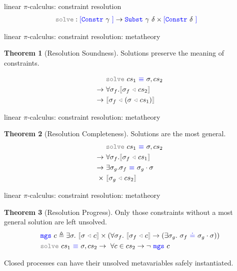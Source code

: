 \documentclass[dvipsnames]{beamer}
\theoremstyle{definition}\newtheorem{mytheorem}{Theorem}[section]
\newcommand{\picalc}{$\pi$-calculus}
\newcommand{\func}[1]{\textcolor{gray}{\mathtt{#1}}}
\newcommand{\type}[1]{\textcolor{blue}{\mathtt{#1}}}
\newcommand{\tEq}[2]{#1~\type{\equiv}~#2}
\newcommand{\tConstrs}[1]{\type{[Constr} ~ #1 ~ \type{]}}
\newcommand{\subst}[2]{#1 ~ \func{\triangleleft} ~ #2}
\newcommand{\tSubst}[2]{\type{Subst}~#1~#2}
\newcommand{\interpr}[1]{\func{[\![} #1 \func{]\!]}}
\begin{document}
\begin{frame}{linear \picalc{}: constraint resolution}
\[
\begin{aligned}[c]
\func{solve} &: \tConstrs{\gamma} \to \tSubst{\gamma}{\delta} \times \tConstrs{\delta}
\end{aligned}
\]
\end{frame}

\begin{frame}{linear \picalc{}: constraint resolution: metatheory}
\begin{mytheorem}[Resolution Soundness]\label{resolution-soundness}
Solutions preserve the meaning of constraints.
\end{mytheorem}
\[
\begin{aligned}[c]
& \func{solve}~cs_1 \tEq{} \sigma , cs_2 \\
\to ~ & \forall \sigma_f . \interpr{\subst{\sigma_f}{cs_2}} \\
\to ~ & \interpr{\subst{\sigma_f}{(\subst{\sigma}{cs_1})}}
\end{aligned}
\]
\end{frame}

\begin{frame}{linear \picalc{}: constraint resolution: metatheory}
\begin{mytheorem}[Resolution Completeness]\label{resolution-completeness}
Solutions are the most general.
\[
\begin{aligned}[c]
& \func{solve}~cs_1 \tEq{} \sigma , cs_2 \\
\to ~ & \forall \sigma_f . \interpr{\subst{\sigma_f}{cs_1}} \\
\to ~ & \exists \sigma_g . \sigma_f \tEq{} \sigma_g \cdot \sigma \\
\times ~ & \interpr{\subst{\sigma_g}{cs_2}}
\end{aligned}
\]
\end{mytheorem}
\end{frame}

\begin{frame}{linear \picalc{}: constraint resolution: metatheory}
\begin{mytheorem}[Resolution Progress]\label{resolution-progress}
Only those constraints without a most general solution are left unsolved.
\[
\begin{aligned}[c]
& \type{mgs} ~ c \triangleq \exists \sigma. ~ \interpr{\subst{\sigma}{c}} \times (\forall \sigma_f . ~ \interpr{\subst{\sigma_f}{c}} \to (\exists \sigma_g. ~ \sigma_f ~ \type{\doteq} ~ \sigma_g \cdot \sigma)) \\
& \func{solve}~cs_1 \tEq{} \sigma , cs_2 \to ~ \forall c \in cs_2 \to \neg ~ \type{mgs} ~ c
\end{aligned}
\]
\end{mytheorem}

Closed processes can have their unsolved metavariables safely instantiated.
\end{frame}
\end{document}

